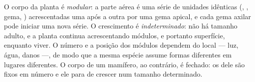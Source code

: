 \begin{proposition}\label{prop:b1:flowering-plant-organization:modular}
O corpo da planta é \emph{modular}: a parte
aérea é uma série de unidades idênticas (, , gema, )
acrescentadas uma após a outra por uma gema apical, e cada gema axilar
pode iniciar uma nova série. O crescimento é
\emph{indeterminado}: não há tamanho
adulto, e a planta continua acrescentando módulos, e portanto
superfície, enquanto viver. O número e a posição dos módulos dependem do
local --- luz, água, danos ---, de modo que a mesma espécie assume
formas diferentes em lugares diferentes. O corpo de um mamífero, ao
contrário, é fechado: os  dele são fixos em número e ele para de
crescer num tamanho determinado.
\end{proposition}

